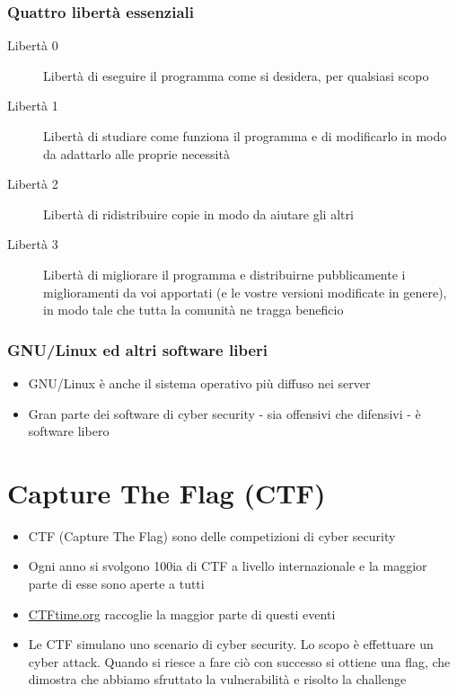 \documentclass{beamer}
\begin{document}
\subsubsection*{Quattro libertà essenziali}
\begin{frame}{\insertsubsection}{\insertsubsubsection}
\begin{description}
\item[Libertà 0] Libertà di eseguire il programma come si desidera, per
qualsiasi scopo
\item[Libertà 1] Libertà di studiare come funziona il programma e di
modificarlo in modo da adattarlo alle proprie necessità
\item[Libertà 2] Libertà di ridistribuire copie in modo da aiutare gli
altri
\item[Libertà 3] Libertà di migliorare il programma e distribuirne
pubblicamente i miglioramenti da voi apportati (e le vostre versioni
modificate in genere), in modo tale che tutta la comunità ne tragga
beneficio
\end{description}
\end{frame}

\subsubsection*{GNU/Linux ed altri software liberi}
\begin{frame}{\insertsubsection}{\insertsubsubsection}
\begin{itemize}
\item GNU/Linux è anche il sistema operativo più diffuso nei server
\item Gran parte dei software di cyber security - sia offensivi che
difensivi - è software libero
\end{itemize}
\end{frame}

\section{Capture The Flag (CTF)}
\begin{frame}{\insertsection}
\begin{itemize}
\item CTF (Capture The Flag) sono delle competizioni di cyber security
\item Ogni anno si svolgono 100ia di CTF a livello internazionale e la maggior
parte di esse sono aperte a tutti
\item \href{https://ctftime.org}{CTFtime.org} raccoglie la maggior parte di
questi eventi
\item Le CTF simulano uno scenario di \alert{cyber security}. Lo scopo è
effettuare un \alert{cyber attack}. Quando si riesce a fare ciò con successo si
ottiene una \alert{flag}, che dimostra che abbiamo sfruttato la
\alert{vulnerabilità} e risolto la \alert{challenge}
\end{itemize}
\end{frame}
\end{document}
